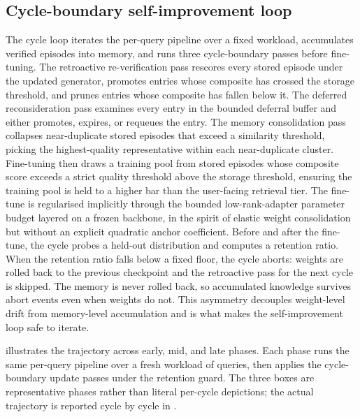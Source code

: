 \subsection{Cycle-boundary self-improvement loop}
\label{sec:cycle-loop}

The cycle loop iterates the per-query pipeline over a fixed workload, accumulates verified episodes into memory, and runs three cycle-boundary passes before fine-tuning. The retroactive re-verification pass rescores every stored episode under the updated generator, promotes entries whose composite has crossed the storage threshold, and prunes entries whose composite has fallen below it. The deferred reconsideration pass examines every entry in the bounded deferral buffer and either promotes, expires, or requeues the entry. The memory consolidation pass collapses near-duplicate stored episodes that exceed a similarity threshold, picking the highest-quality representative within each near-duplicate cluster. Fine-tuning then draws a training pool from stored episodes whose composite score exceeds a strict quality threshold above the storage threshold, ensuring the training pool is held to a higher bar than the user-facing retrieval tier. The fine-tune is regularised implicitly through the bounded low-rank-adapter parameter budget layered on a frozen backbone, in the spirit of elastic weight consolidation \cite{doi:10.1073/pnas.1611835114} but without an explicit quadratic anchor coefficient. Before and after the fine-tune, the cycle probes a held-out distribution and computes a retention ratio. When the retention ratio falls below a fixed floor, the cycle aborts: weights are rolled back to the previous checkpoint and the retroactive pass for the next cycle is skipped. The memory is never rolled back, so accumulated knowledge survives abort events even when weights do not. This asymmetry decouples weight-level drift from memory-level accumulation and is what makes the self-improvement loop safe to iterate.

 illustrates the trajectory across early, mid, and late phases. Each phase runs the same per-query pipeline over a fresh workload of queries, then applies the cycle-boundary update passes under the retention guard. The three boxes are representative phases rather than literal per-cycle depictions; the actual trajectory is reported cycle by cycle in .

